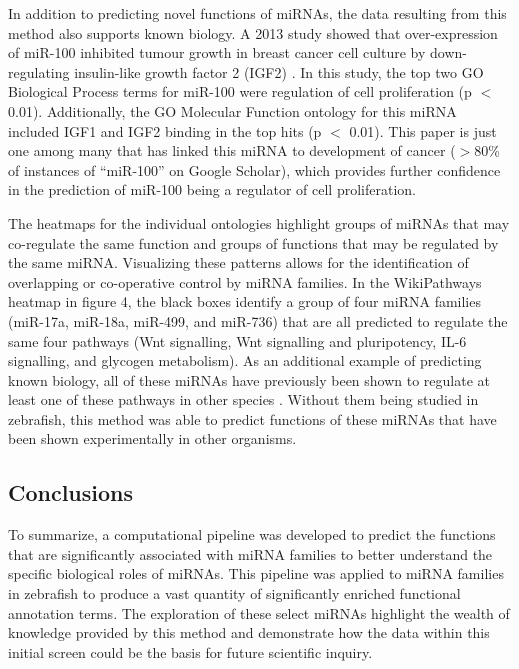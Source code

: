 \documentclass[12pt]{article}
\begin{document}
In addition to predicting novel functions of miRNAs, the data resulting from this method also supports known biology. A 2013 study showed that over-expression of miR-100 inhibited tumour growth in breast cancer cell culture by down-regulating insulin-like growth factor 2 (IGF2) \cite{gebeshuber2013mir}. In this study, the top two GO Biological Process terms for miR-100 were regulation of cell proliferation (p $<$ 0.01). Additionally, the GO Molecular Function ontology for this miRNA included IGF1 and IGF2 binding in the top hits (p $<$ 0.01). This paper is just one among many that has linked this miRNA to development of cancer ($>$80\% of instances of ``miR-100'' on Google Scholar), which provides further confidence in the prediction of miR-100 being a regulator of cell proliferation.

The heatmaps for the individual ontologies highlight groups of miRNAs that may co-regulate the same function and groups of functions that may be regulated by the same miRNA. Visualizing these patterns allows for the identification of overlapping or co-operative control by miRNA families. In the WikiPathways heatmap in figure 4, the black boxes identify a group of four miRNA families (miR-17a, miR-18a, miR-499, and miR-736) that are all predicted to regulate the same four pathways (Wnt signalling, Wnt signalling and pluripotency, IL-6 signalling, and glycogen metabolism). As an additional example of predicting known biology, all of these miRNAs have previously been shown to regulate at least one of these pathways in other species \cite{andreassen2013discovery, brock2011microrna, wilson2010dynamic}. Without them being studied in zebrafish, this method was able to predict functions of these miRNAs that have been shown experimentally in other organisms.

\subsection{Conclusions}

To summarize, a computational pipeline was developed to predict the functions that are significantly associated with miRNA families to better understand the specific biological roles of miRNAs. This pipeline was applied to miRNA families in zebrafish to produce a vast quantity of significantly enriched functional annotation terms. The exploration of these select miRNAs highlight the wealth of knowledge provided by this method and demonstrate how the data within this initial screen could be the basis for future scientific inquiry.
\end{document}
